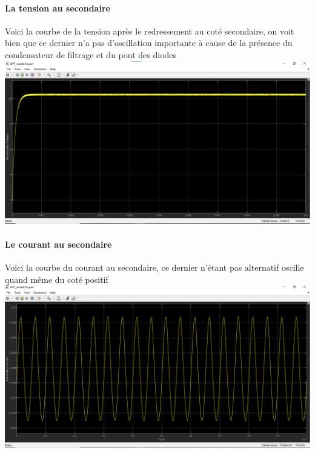 \documentclass[12pt,a4paper,titlepage,notitlepage]{article}
\begin{document}
	\paragraph{La tension au secondaire\\}
	Voici la courbe de la tension après le redressement au coté secondaire, on voit bien que ce dernier n'a pas d'oscillation importante à cause de la présence du condensateur de filtrage et du pont des diodes\\ 
	\includegraphics[width=1\textwidth]{WPT_simul_sv}
	
	\paragraph{Le courant au secondaire\\}
	Voici la courbe du courant au secondaire, ce dernier n'étant pas alternatif oscille quand même du coté positif\\ 
	\includegraphics[width=1\textwidth]{WPT_simul_sc}
	
\end{document}
